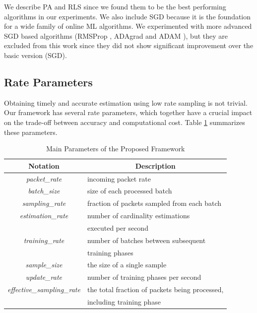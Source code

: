 		We describe PA and RLS since we found them to be the best performing algorithms in our experiments. We also include SGD because it is the foundation for a wide family of online ML algorithms. We experimented with more advanced SGD based algorithms (RMSProp {\cite{tieleman2012lecture}}, ADAgrad {\cite{duchi2011adaptive}} and ADAM {\cite{kingma2014adam}}), but they are excluded from this work since they did not show significant improvement over the basic version (SGD).
	
		\subsection{Rate Parameters} \label{subsec:rate_params}
			
			Obtaining timely and accurate estimation using low rate sampling is not trivial. Our framework has several rate parameters, which together have a crucial impact on the trade-off between accuracy and computational cost. Table \ref{table:rate_params} summarizes these parameters.
			
			\begin{table}[!tb]
				\centering 
				\begin{tabular}{|c|l|} \hline
					\textbf{Notation} & \multicolumn{1}{c|}{\textbf{Description}}  \\\hline
					\emph{packet\_rate} & incoming packet rate \\\hline
					\emph{batch\_size} & size of each processed batch \\\hline
					\emph{sampling\_rate} & fraction of packets sampled from each batch \\\hline
					\emph{estimation\_rate} & number of cardinality estimations\\
					& executed per second  \\\hline
					\emph{training\_rate} & number of batches between subsequent\\
					& training phases \\\hline
					\emph{sample\_size} & the size of a single sample \\\hline
					\emph{update\_rate} & number of training phases per second \\\hline
					\emph{effective\_sampling\_rate} & the total fraction of packets being processed,\\
					& including training phase \\\hline
				\end{tabular}
				\caption{Main Parameters of the Proposed Framework} 
				\label{table:rate_params}
			\end{table}
			
